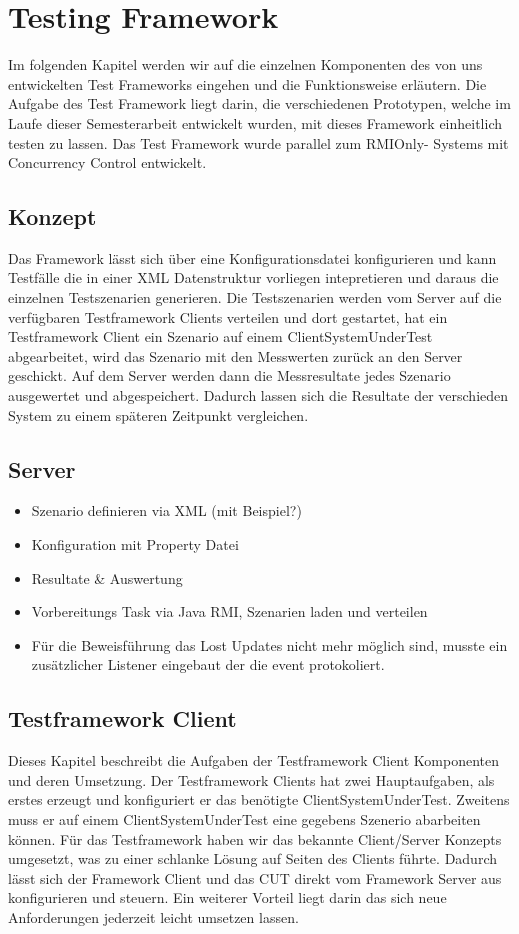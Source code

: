 \section{Testing Framework}
\label{sec:testing Framework}
Im folgenden Kapitel werden wir auf die einzelnen Komponenten des von uns entwickelten Test Frameworks eingehen und die Funktionsweise erläutern. Die Aufgabe des Test Framework liegt darin, die verschiedenen Prototypen, welche im Laufe dieser Semesterarbeit entwickelt wurden, mit dieses Framework einheitlich testen zu lassen. Das Test Framework wurde parallel zum RMIOnly- Systems mit Concurrency Control entwickelt.

\subsection{Konzept}
Das Framework lässt sich über eine Konfigurationsdatei konfigurieren und kann Testfälle die in einer XML Datenstruktur vorliegen intepretieren und daraus die einzelnen Testszenarien generieren. Die Testszenarien werden vom Server auf die verfügbaren Testframework Clients verteilen und dort gestartet, hat ein Testframework Client ein Szenario auf einem ClientSystemUnderTest abgearbeitet, wird das Szenario mit den Messwerten zurück an den Server geschickt. Auf dem Server werden dann die Messresultate jedes Szenario ausgewertet und abgespeichert. Dadurch lassen sich die Resultate der verschieden System zu einem späteren Zeitpunkt vergleichen.


\subsection{Server}
\label{sec:test-FW Server}
\begin{itemize}
\item Szenario definieren via XML (mit Beispiel?)
\item Konfiguration mit Property Datei
\item Resultate \& Auswertung
\item Vorbereitungs Task via Java RMI, Szenarien laden und verteilen
\item Für die Beweisführung das Lost Updates nicht mehr möglich sind, musste ein zusätzlicher Listener eingebaut der die event protokoliert.
\end{itemize}

\subsection{Testframework Client}
\label{sec:test-FW Client}
Dieses Kapitel beschreibt die Aufgaben der Testframework Client Komponenten und deren Umsetzung. Der Testframework Clients hat zwei Hauptaufgaben, als erstes erzeugt und konfiguriert er das benötigte ClientSystemUnderTest. Zweitens muss er auf einem ClientSystemUnderTest eine gegebens Szenerio abarbeiten können. Für das Testframework haben wir das bekannte Client/Server Konzepts umgesetzt, was zu einer schlanke Lösung auf Seiten des Clients führte. Dadurch lässt sich der Framework Client und das CUT direkt vom Framework Server aus konfigurieren und steuern. Ein weiterer Vorteil liegt darin das sich neue Anforderungen jederzeit leicht umsetzen lassen.


